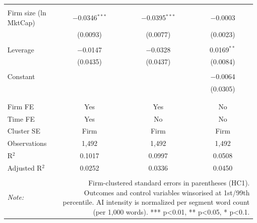 \begin{table}[!htbp]
\begin{tabular}{@{\extracolsep{5pt}}lccc}
  & & & \\ 
 Firm size (ln MktCap) & $-$0.0346$^{***}$ & $-$0.0395$^{***}$ & $-$0.0003 \\ 
  & (0.0093) & (0.0077) & (0.0023) \\ 
  & & & \\ 
 Leverage & $-$0.0147 & $-$0.0328 & 0.0169$^{**}$ \\ 
  & (0.0435) & (0.0437) & (0.0084) \\ 
  & & & \\ 
 Constant &  &  & $-$0.0064 \\ 
  &  &  & (0.0305) \\ 
  & & & \\ 
\hline \\[-1.8ex] 
Firm FE & Yes & Yes & No \\ 
Time FE & Yes & No & No \\ 
Cluster SE & Firm & Firm & Firm \\ 
Observations & 1,492 & 1,492 & 1,492 \\ 
R$^{2}$ & 0.1017 & 0.0997 & 0.0508 \\ 
Adjusted R$^{2}$ & 0.0252 & 0.0336 & 0.0450 \\ 
\hline 
\hline \\[-1.8ex] 
\textit{Note:}  & \multicolumn{3}{r}{Firm-clustered standard errors in parentheses (HC1). Outcomes and control variables winsorised at 1st/99th percentile. AI intensity is normalized per segment word count (per 1,000 words). *** p<0.01, ** p<0.05, * p<0.1.} \\ 
\end{tabular} 
\end{table} 
